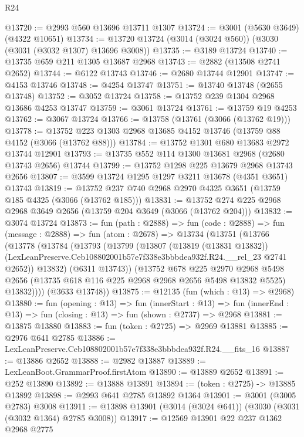 \begin{lexlean}{R24}
\begin{coremodule}
@13720 := @2993 @560 @13696 @13711 @1307
@13724 := @3001 (@5630 @3649) (@4322 @10651)
@13734 := @13720 @13724 (@3014 (@3024 @560)) (@3030 (@3031 (@3032 @1307) @13696 @3008))
@13735 := @3189 @13724
@13740 := @13735 @659 @211 @1305 @13687 @2968
@13743 := @2882 (@13508 @2741 @2652)
@13744 := @6122 @13743
@13746 := @2680 @13744 @12901
@13747 := @4153 @13746
@13748 := @4254 @13747
@13751 := @13740 @13748 (@2655 @13748)
@13752 := @3052 @13724
@13758 := @13752 @239 @1304 @2968 @13686 @4253 @13747
@13759 := @3061 @13724
@13761 := @13759 @19 @4253
@13762 := @3067 @13724
@13766 := @13758 (@13761 (@3066 (@13762 @19)))
@13778 := @13752 @223 @1303 @2968 @13685 @4152 @13746 (@13759 @88 @4152 (@3066 (@13762 @88)))
@13784 := @13752 @1301 @680 @13683 @2972 @13744 @12901
@13793 := @13735 @552 @114 @1300 @13681 @2968 (@2680 @13743 @2656) @13744
@13799 := @13752 @1298 @225 @13679 @2968 @13743 @2656
@13807 := @3599 @13724 @1295 @1297 @3211 @13678 (@4351 @3651) @13743
@13819 := @13752 @237 @740 @2968 @2970 @4325 @3651 (@13759 @185 @4325 (@3066 (@13762 @185)))
@13831 := @13752 @274 @225 @2968 @2968 @3649 @2656 (@13759 @204 @3649 (@3066 (@13762 @204)))
@13832 := @3074 @13724
@13873 := fun (path : @2888) =>
  fun (code : @2888) =>
  fun (message : @2888) =>
  fun (atom : @2678) =>
  @13734
    (@13751
      (@13766
        (@13778
          (@13784
            (@13793
              (@13799
                (@13807
                  (@13819 (@13831 @13832))
                  (LexLeanPreserve.Ceb108802001b57e7f338e3bbbdea932f.R24.__rel_23 @2741 @2652))
                @13832)
              (@6311 @13743))
            (@13752
              @678
              @225
              @2970
              @2968
              @5498
              @2656
              (@13735 @618 @116 @225 @2968 @2968 @2656 @5498 @13832 @5525)
              @13832))))
      (@3633 @13748))
@13875 := @12135 (fun (which : @13) => @2968)
@13880 := fun (opening : @13) =>
  fun (innerStart : @13) =>
  fun (innerEnd : @13) => fun (closing : @13) => fun (shown : @2737) => @2968
@13881 := @13875 @13880
@13883 := fun (token : @2725) => @2969 @13881
@13885 := @2976 @641 @2785
@13886 := LexLeanPreserve.Ceb108802001b57e7f338e3bbbdea932f.R24.__fits_16
@13887 := @13886 @2652
@13888 := @2982 @13887
@13889 := LexLeanBoot.GrammarProof.firstAtom
@13890 := @13889 @2652
@13891 := @252 @13890
@13892 := @13888 @13891
@13894 := (token : @2725) -> @13885 @13892
@13898 := @2993 @641 @2785 @13892 @1364
@13901 := @3001 (@3005 @2783) @3008
@13911 := @13898 @13901 (@3014 (@3024 @641)) (@3030 (@3031 (@3032 @1364) @2785 @3008))
@13917 := @12569 @13901 @22 @237 @1362 @2968 @2775

\end{coremodule}
\end{lexlean}
